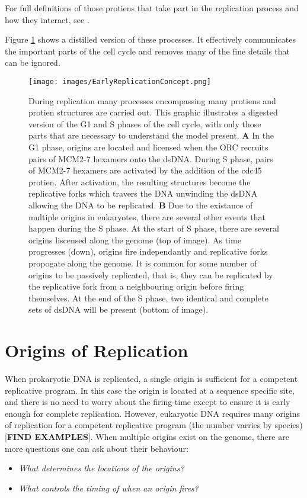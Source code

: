 		For full definitions of those protiens that take part in the replication process and how they interact, see \cite{PurifiedProteins}.
		
	Figure \ref{EarlyReplicationConcept} shows a distilled version of these processes. It effectively communicates the important parts of the cell cycle and removes many of the fine details that can be ignored.
	
	\begin{figure}[tbh]
		\begin{center}
			\texttt{[image: images/EarlyReplicationConcept.png]}
		\end{center}
			\caption[Events During Replication]{\label{EarlyReplicationConcept} During replication many processes encompassing many protiens and protien structures are carried out.
				This graphic illustrates a digested version of the G1 and S phases of the cell cycle, with only those parts that are necessary to understand the model present.
				\textbf{A} In the G1 phase, origins are located and licensed when the ORC recruits pairs of MCM2-7 hexamers onto the dsDNA.
					During S phase, pairs of MCM2-7 hexamers are activated by the addition of the cdc45 protien.
					After activation, the resulting structures become the replicative forks which travers the DNA unwinding the dsDNA allowing the DNA to be replicated.
				\textbf{B} Due to the existance of multiple origins in eukaryotes, there are several other events that happen during the S phase.
					At the start of S phase, there are several origins liscensed along the genome (top of image).
					As time progresses (down), origins fire independantly and replicative forks propogate along the genome.
					It is common for some number of origins to be passively replicated, that is, they can be replicated by the replicative fork from a neighbouring origin before firing themselves.
					At the end of the S phase, two identical and complete sets of dsDNA will be present (bottom of image).}
	\end{figure}
	
	
	\section{Origins of Replication}
	
	When prokaryotic DNA is replicated, a single origin is sufficient for a competent replicative program.
	In this case the origin is located at a sequence specific site, and there is no need to worry about the firing-time except to ensure it is early enough for complete replication.
	However, eukaryotic DNA requires many origins of replication for a competent replicative program (the number varries by species) [\textbf{FIND EXAMPLES}].
	When multiple origins exist on the genome, there are more questions one can ask about their behaviour:
	\begin{itemize}
		\item \emph{What determines the locations of the origins?}
		\item \emph{What controls the timing of when an origin fires?}
	\end{itemize}
	
